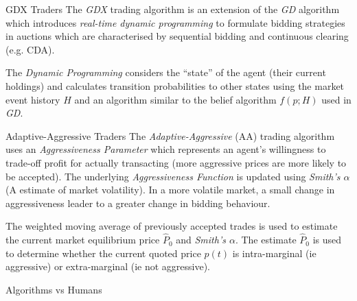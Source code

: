 \documentclass[11pt,a4paper]{article}
\begin{document}
  \begin{definition}{GDX Traders}
    The \textit{GDX} trading algorithm is an extension of the \textit{GD} algorithm which introduces \textit{real-time dynamic programming} to formulate bidding strategies in auctions which are characterised by sequential bidding and continuous clearing (e.g. CDA).
    \par The \textit{Dynamic Programming} considers the ``state'' of the agent (their current holdings) and calculates transition probabilities to other states using the market event history $H$ and an algorithm similar to the belief algorithm $f(p;H)$ used in \textit{GD}.
  \end{definition}

  \begin{definition}{Adaptive-Aggressive Traders}
    The \textit{Adaptive-Aggressive} (AA) trading algorithm uses an \textit{Aggressiveness Parameter} which represents an agent's willingness to trade-off profit for actually transacting (more aggressive prices are more likely to be accepted). The underlying \textit{Aggressiveness Function} is updated using \textit{Smith's $\alpha$} (A estimate of market volatility). In a more volatile market, a small change in aggressiveness leader to a greater change in bidding behaviour.

    \par The weighted moving average of previously accepted trades is used to estimate the current market equilibrium price $\hat{P}_0$ and \textit{Smith's $\alpha$}. The estimate $\hat{P}_0$ is used to determine whether the current quoted price $p(t)$ is intra-marginal (ie aggressive) or extra-marginal (ie not aggressive).
  \end{definition}

  \begin{remark}{Algorithms vs Humans}
  \end{remark}
\end{document}
